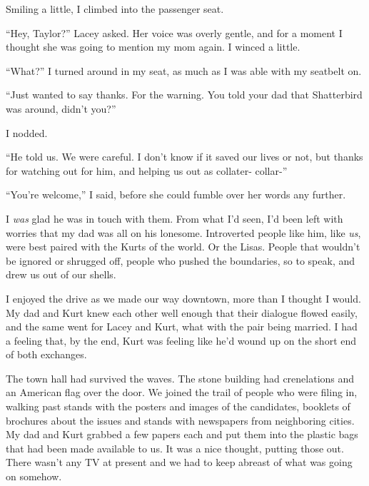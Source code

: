 Smiling a little, I climbed into the passenger seat.



``Hey, Taylor?'' Lacey asked.  Her voice was overly gentle, and for a moment I thought she was going to mention my mom again.  I winced a little.



``What?''  I turned around in my seat, as much as I was able with my seatbelt on.



``Just wanted to say thanks.  For the warning.  You told your dad that Shatterbird was around, didn't you?''



I nodded.



``He told us.  We were careful.  I don't know if it saved our lives or not, but thanks for watching out for him, and helping us out as collater- collar-''



``You're welcome,'' I said, before she could fumble over her words any further.



I \emph{was} glad he was in touch with them.  From what I'd seen, I'd been left with worries that my dad was all on his lonesome.  Introverted people like him, like \emph{us}, were best paired with  the Kurts of the world.  Or the Lisas.  People that wouldn't be ignored or shrugged off, people who pushed the boundaries, so to speak, and drew us out of our shells.



I enjoyed the drive as we made our way downtown, more than I thought I would.  My dad and Kurt knew each other well enough that their dialogue flowed easily, and the same went for Lacey and Kurt, what with the pair being married.  I had a feeling that, by the end, Kurt was feeling like he'd wound up on the short end of both exchanges.



The town hall had survived the waves.  The stone building had crenelations and an American flag over the door.  We joined the trail of people who were filing in, walking past stands with the posters and images of the candidates, booklets of brochures about the issues and stands with newspapers from neighboring cities.  My dad and Kurt grabbed a few papers each and put them into the plastic bags that had been made available to us.  It was a nice thought, putting those out.  There wasn't any TV at present and we had to keep abreast of what was going on somehow.



